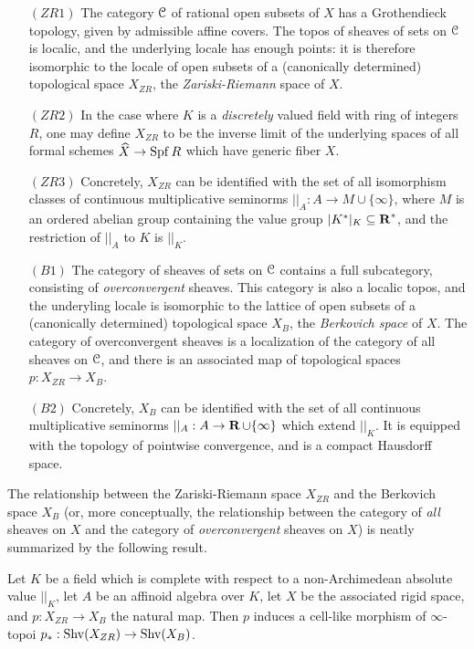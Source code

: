 \begin{itemize}
\item[$(ZR1)$] The category $\operatorname{\mathcal{C}}$ of rational open subsets of $X$ has a Grothendieck topology, given by admissible affine covers. The topos of sheaves of sets on $\operatorname{\mathcal{C}}$ is localic, and the underlying locale has enough points: it is therefore isomorphic to the locale of open subsets of a (canonically determined) topological space $X_{ZR}$, the {\it Zariski-Riemann} space of $X$.
 
\item[$(ZR2)$] In the case where $K$ is a {\em discretely} valued field with ring of integers $R$, one may define $X_{ZR}$ to be the inverse limit of the underlying spaces of all formal schemes
$\widehat{X} \rightarrow \operatorname{Spf} R$ which have generic fiber $X$.
\item[$(ZR3)$] Concretely, $X_{ZR}$ can be identified with the set of all isomorphism classes of continuous multiplicative seminorms $||_A: A \rightarrow M \cup \{\infty\}$, where $M$ is an ordered abelian group containing the value group $|K^{\ast}|_{K} \subseteq \operatorname{\mathbf{R}}^{\ast}$, and the restriction
of $||_A$ to $K$ is $||_K$.

\item[$(B1)$] The category of sheaves of sets on $\operatorname{\mathcal{C}}$ contains a full subcategory, consisting of {\em overconvergent} sheaves. This category is also a localic topos, and the underyling locale is isomorphic to the lattice of open subsets of a (canonically determined) topological space $X_{B}$, the {\it Berkovich space} of $X$. The category of overconvergent sheaves is a localization of the category of all sheaves on $\operatorname{\mathcal{C}}$, and there is an associated map of topological spaces
$p: X_{ZR} \rightarrow X_B$.

\item[$(B2)$] Concretely, $X_{B}$ can be identified with the set of all continuous multiplicative seminorms $||_A: A \rightarrow \operatorname{\mathbf{R}} \cup \{\infty\}$ which extend $||_K$. It is equipped with the topology of pointwise convergence, and is a compact Hausdorff space. 
\end{itemize}

The relationship between the Zariski-Riemann space $X_{ZR}$ and the Berkovich space $X_{B}$ (or, more conceptually, the relationship between the category of {\em all} sheaves on $X$ and the category of {\em overconvergent} sheaves on $X$) is neatly summarized by the following result.

\begin{proposition}\label{rigidex}
Let $K$ be a field which is complete with respect to a non-Archimedean absolute value $||_K$, let $A$ be an affinoid algebra over $K$, let $X$ be the associated rigid space, and $p: X_{ZR} \rightarrow X_{B}$ the natural map. Then $p$ induces a
cell-like morphism of $\infty$-topoi $p_{\ast}: \operatorname{Shv}(X_{ZR}) \rightarrow \operatorname{Shv}(X_{B})$. 
\end{proposition}

